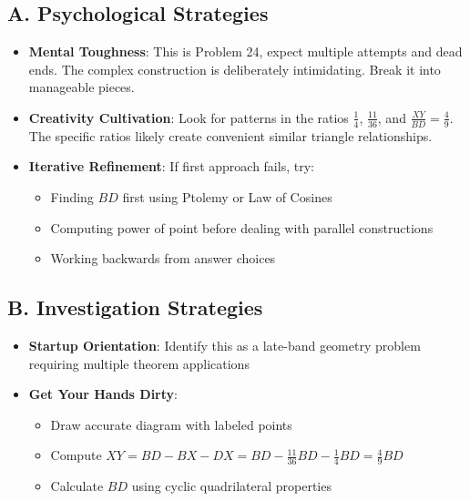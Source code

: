 \documentclass[]{article}
\begin{document}
\begin{strategicbox}
\subsection*{A. Psychological Strategies}
\begin{itemize}[leftmargin=*]
    \item \textbf{Mental Toughness}: This is Problem 24, expect multiple attempts and dead ends. The complex construction is deliberately intimidating. Break it into manageable pieces.
    
    \item \textbf{Creativity Cultivation}: Look for patterns in the ratios $\frac{1}{4}$, $\frac{11}{36}$, and $\frac{XY}{BD} = \frac{4}{9}$. The specific ratios likely create convenient similar triangle relationships.
    
    \item \textbf{Iterative Refinement}: If first approach fails, try:
    \begin{itemize}
        \item Finding $BD$ first using Ptolemy or Law of Cosines
        \item Computing power of point before dealing with parallel constructions
        \item Working backwards from answer choices
    \end{itemize}
\end{itemize}

\subsection*{B. Investigation Strategies}
\begin{itemize}[leftmargin=*]
    \item \textbf{Startup Orientation}: Identify this as a late-band geometry problem requiring multiple theorem applications
    
    \item \textbf{Get Your Hands Dirty}: 
    \begin{itemize}
        \item Draw accurate diagram with labeled points
        \item Compute $XY = BD - BX - DX = BD - \frac{11}{36}BD - \frac{1}{4}BD = \frac{4}{9}BD$
        \item Calculate $BD$ using cyclic quadrilateral properties
    \end{itemize}
    

\end{itemize}
\end{strategicbox}
\end{document}
